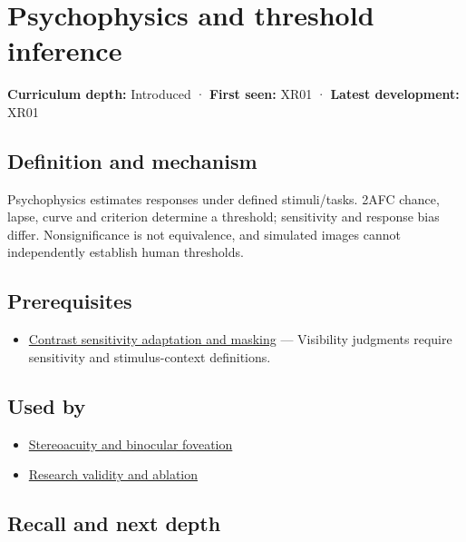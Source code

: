 \hypertarget{appendix-1759f03e8ce7}{}\label{referencestart:appendix-1759f03e8ce7}
\section{Psychophysics and threshold inference}\label{appendix-1759f03e8ce7-psychophysics-and-threshold-inference}

\textbf{Curriculum depth:} Introduced · \textbf{First seen:} XR01 · \textbf{Latest development:} XR01

\subsection{Definition and mechanism}\label{appendix-1759f03e8ce7-definition-and-mechanism}

Psychophysics estimates responses under defined stimuli/tasks. 2AFC chance, lapse, curve and criterion determine a threshold; sensitivity and response bias differ. Nonsignificance is not equivalence, and simulated images cannot independently establish human thresholds.

\subsection{Prerequisites}\label{appendix-1759f03e8ce7-prerequisites}

\begin{itemize}
\tightlist
\item
  \hyperref[appendix-b3aa9e8e01ad]{Contrast sensitivity adaptation and masking} --- Visibility judgments require sensitivity and stimulus-context definitions.
\end{itemize}

\subsection{Used by}\label{appendix-1759f03e8ce7-used-by}

\begin{itemize}
\tightlist
\item
  \hyperref[appendix-8dc848f14052]{Stereoacuity and binocular foveation}
\item
  \hyperref[appendix-65788587ef78]{Research validity and ablation}
\end{itemize}

\subsection{Recall and next depth}\label{appendix-1759f03e8ce7-recall-and-next-depth}

